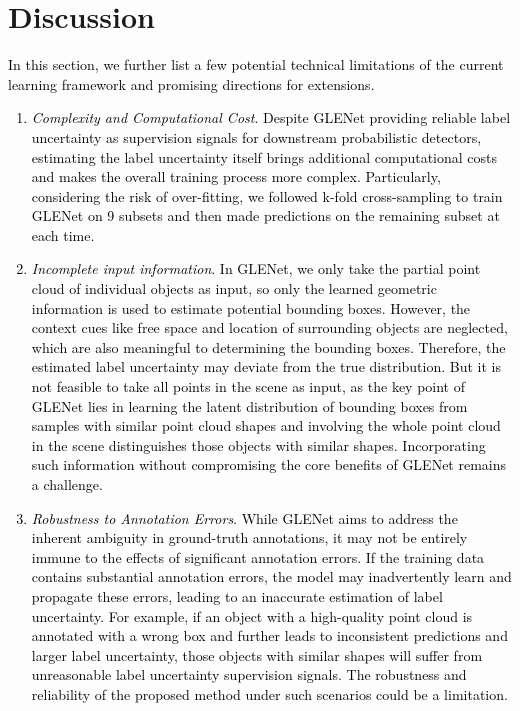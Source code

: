 \documentclass[twocolumn]{svjour3}
\newcommand{\revise}[1]{\textcolor{black}{#1}}
\begin{document}
\section{Discussion}
\noindent
\revise{
In this section, we further list a few potential technical limitations of the current learning framework and promising directions for extensions.
\begin{enumerate}[label=(\arabic*)]
	\item \textit{Complexity and Computational Cost}. Despite GLENet providing reliable label uncertainty as supervision signals for downstream probabilistic detectors, estimating the label uncertainty itself brings additional computational costs and makes the overall training process more complex. Particularly, considering the risk of over-fitting, we followed k-fold cross-sampling to train GLENet on 9 subsets and then made predictions on the remaining subset at each time.
	\item \textit{Incomplete input information}. In GLENet, we only take the partial point cloud of individual objects as input, so only the learned geometric information is used to estimate potential bounding boxes. However, the context cues like free space and location of surrounding objects are neglected, which are also meaningful to determining the bounding boxes. Therefore, the estimated label uncertainty may deviate from the true distribution. But it is not feasible to take all points in the scene as input, as the key point of GLENet lies in learning the latent distribution of bounding boxes from samples with similar point cloud shapes and involving the whole point cloud in the scene distinguishes those objects with similar shapes. Incorporating such information without compromising the core benefits of GLENet remains a challenge.
	\item \textit{Robustness to Annotation Errors}. While GLENet aims to address the inherent ambiguity in ground-truth annotations, it may not be entirely immune to the effects of significant annotation errors.
	If the training data contains substantial annotation errors, the model may inadvertently learn and propagate these errors, leading to an inaccurate estimation of label uncertainty. For example, if an object with a high-quality point cloud is annotated with a wrong box and further leads to inconsistent predictions and larger label uncertainty, those objects with similar shapes will suffer from unreasonable label uncertainty supervision signals.
	The robustness and reliability of the proposed method under such scenarios could be a limitation. 

\end{enumerate}}
\end{document}
